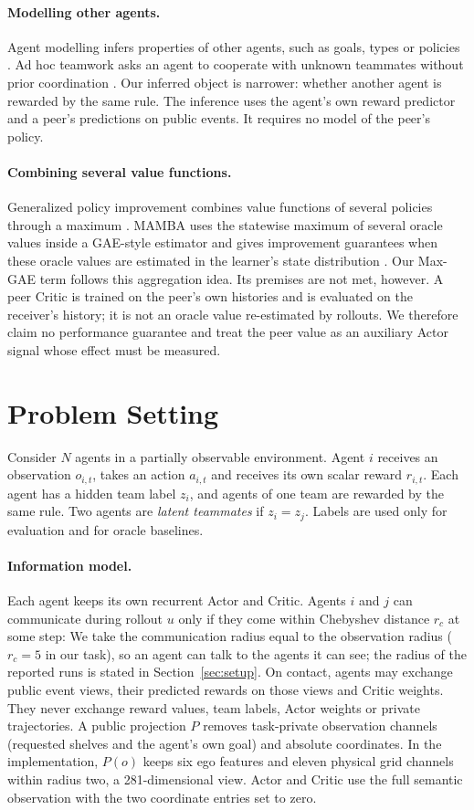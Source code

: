 \documentclass{article}
\begin{document}
\paragraph{Modelling other agents.}
Agent modelling infers properties of other agents, such as goals, types or policies \cite{modelling}. Ad hoc teamwork asks an agent to cooperate with unknown teammates without prior coordination \cite{adhoc}. Our inferred object is narrower: whether another agent is rewarded by the same rule. The inference uses the agent's own reward predictor and a peer's predictions on public events. It requires no model of the peer's policy.

\paragraph{Combining several value functions.}
Generalized policy improvement combines value functions of several policies through a maximum \cite{gpi}. MAMBA uses the statewise maximum of several oracle values inside a GAE-style estimator and gives improvement guarantees when these oracle values are estimated in the learner's state distribution \cite{mamba}. Our Max-GAE term follows this aggregation idea. Its premises are not met, however. A peer Critic is trained on the peer's own histories and is evaluated on the receiver's history; it is not an oracle value re-estimated by rollouts. We therefore claim no performance guarantee and treat the peer value as an auxiliary Actor signal whose effect must be measured.

\section{Problem Setting}
Consider $N$ agents in a partially observable environment. Agent $i$ receives an observation $o_{i,t}$, takes an action $a_{i,t}$ and receives its own scalar reward $r_{i,t}$. Each agent has a hidden team label $z_i$, and agents of one team are rewarded by the same rule. Two agents are \emph{latent teammates} if $z_i=z_j$. Labels are used only for evaluation and for oracle baselines.

\paragraph{Information model.}
Each agent keeps its own recurrent Actor and Critic. Agents $i$ and $j$ can communicate during rollout $u$ only if they come within Chebyshev distance $r_c$ at some step:
\DonorEquation
We take the communication radius equal to the observation radius ($r_c=5$ in our task), so an agent can talk to the agents it can see; the radius of the reported runs is stated in Section~\ref{sec:setup}. On contact, agents may exchange public event views, their predicted rewards on those views and Critic weights. They never exchange reward values, team labels, Actor weights or private trajectories. A public projection $P$ removes task-private observation channels (requested shelves and the agent's own goal) and absolute coordinates. In the implementation, $P(o)$ keeps six ego features and eleven physical grid channels within radius two, a 281-dimensional view. Actor and Critic use the full semantic observation with the two coordinate entries set to zero.
\end{document}
